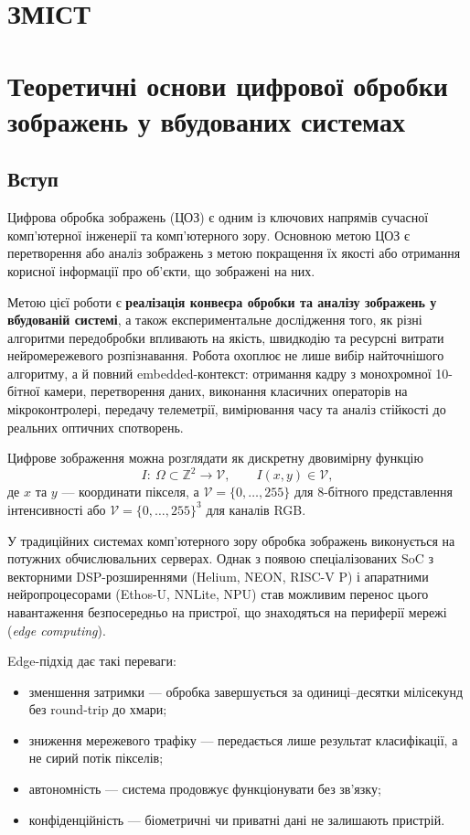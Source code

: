 \documentclass[a4paper,12pt]{article}
\renewcommand{\contentsname}{ЗМІСТ}
\let\oldsection\section
\renewcommand{\section}{\clearpage\oldsection}
\begin{document}
\newpage

\pdfbookmark[1]{\contentsname}{toc}
\section*{\contentsname}
\tableofcontents
\newpage

\section{Теоретичні основи цифрової обробки зображень у вбудованих системах}

\subsection{Вступ}

Цифрова обробка зображень (ЦОЗ) є одним із ключових напрямів сучасної комп'ютерної інженерії та комп'ютерного зору. Основною метою ЦОЗ є перетворення або аналіз зображень з метою покращення їх якості або отримання корисної інформації про об'єкти, що зображені на них.

Метою цієї роботи є \textbf{реалізація конвеєра обробки та аналізу зображень у вбудованій системі}, а також експериментальне дослідження того, як різні алгоритми передобробки впливають на якість, швидкодію та ресурсні витрати нейромережевого розпізнавання. Робота охоплює не лише вибір найточнішого алгоритму, а й повний embedded-контекст: отримання кадру з монохромної 10-бітної камери, перетворення даних, виконання класичних операторів на мікроконтролері, передачу телеметрії, вимірювання часу та аналіз стійкості до реальних оптичних спотворень.

Цифрове зображення можна розглядати як дискретну двовимірну функцію
\[
I:\ \Omega\subset\mathbb{Z}^2 \to \mathcal{V},\qquad I(x,y)\in\mathcal{V},
\]
де \(x\) та \(y\) --- координати пікселя, а \(\mathcal{V}=\{0,\dots,255\}\) для 8-бітного представлення інтенсивності або \(\mathcal{V}=\{0,\dots,255\}^3\) для каналів RGB.

У традиційних системах комп'ютерного зору обробка зображень виконується на потужних обчислювальних серверах. Однак з появою спеціалізованих SoC з векторними DSP-розширеннями (Helium, NEON, RISC-V P) і апаратними нейропроцесорами (Ethos-U, NNLite, NPU) став можливим перенос цього навантаження безпосередньо на пристрої, що знаходяться на периферії мережі (\textit{edge computing}).

Edge-підхід дає такі переваги:
\begin{itemize}
	\item зменшення затримки --- обробка завершується за одиниці--десятки мілісекунд без round-trip до хмари;
	\item зниження мережевого трафіку --- передається лише результат класифікації, а не сирий потік пікселів;
	\item автономність --- система продовжує функціонувати без зв'язку;
	\item конфіденційність --- біометричні чи приватні дані не залишають пристрій.
\end{itemize}
\end{document}
